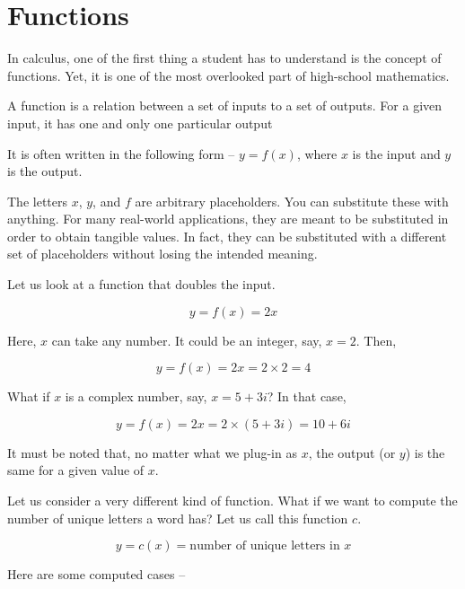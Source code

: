 \chapter{Functions}
In calculus, one of the first thing a student has to understand is the concept of functions. Yet, it is one of the most overlooked part of high-school mathematics.

\begin{definition}[Function]
A function is a relation between a set of inputs to a set of outputs. For a given input, it has one and only one particular output
\end{definition}

It is often written in the following form -- $y = f(x)$, where $x$ is the input and $y$ is the output.

The letters $x$, $y$, and $f$ are arbitrary placeholders. You can substitute these with anything. For many real-world applications, they are meant to be substituted in order to obtain tangible values. In fact, they can be substituted with a different set of placeholders without losing the intended meaning.

Let us look at a function that doubles the input.

\begin{equation}
y = f(x) = 2x
\end{equation}

Here, $x$ can take any number. It could be an integer, say, $x = 2$. Then,

\begin{equation}
y = f(x) = 2x = 2 \times 2 = 4
\end{equation}

What if $x$ is a complex number, say, $x = 5 + 3i$? In that case,

\begin{equation}
y = f(x) = 2x = 2 \times (5 + 3i) = 10 + 6i
\end{equation}

It must be noted that, no matter what we plug-in as $x$, the output (or $y$) is the same for a given value of $x$.

Let us consider a very different kind of function. What if we want to compute the number of unique letters a word has? Let us call this function $c$.

\begin{equation}
y = c(x) = \text{number of unique letters in $x$}
\end{equation}

Here are some computed cases --

